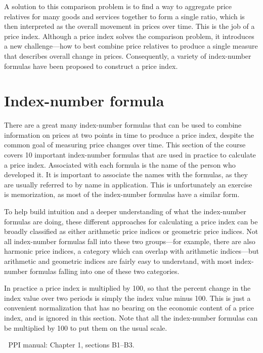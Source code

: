 \documentclass[
]{article}
\begin{document}
A solution to this comparison problem is to find a way to aggregate price relatives for many goods and services together to form a single ratio, which is then interpreted as the overall movement in prices over time. This is the job of a price index. Although a price index solves the comparison problem, it introduces a new challenge---how to best combine price relatives to produce a single measure that describes overall change in prices. Consequently, a variety of index-number formulas have been proposed to construct a price index.

\hypertarget{index-number-formula}{%
\section{Index-number formula}\label{index-number-formula}}

There are a great many index-number formulas that can be used to combine information on prices at two points in time to produce a price index, despite the common goal of measuring price changes over time. This section of the course covers 10 important index-number formulas that are used in practice to calculate a price index. Associated with each formula is the name of the person who developed it. It is important to associate the names with the formulas, as they are usually referred to by name in application. This is unfortunately an exercise is memorization, as most of the index-number formulas have a similar form.

To help build intuition and a deeper understanding of what the index-number formulas are doing, these different approaches for calculating a price index can be broadly classified as either arithmetic price indices or geometric price indices. Not all index-number formulas fall into these two groups---for example, there are also harmonic price indices, a category which can overlap with arithmetic indices---but arithmetic and geometric indices are fairly easy to understand, with most index-number formulas falling into one of these two categories.

In practice a price index is multiplied by 100, so that the percent change in the index value over two periods is simply the index value minus 100. This is just a convenient normalization that has no bearing on the economic content of a price index, and is ignored in this section. Note that all the index-number formulas can be multiplied by 100 to put them on the usual scale.

📖 PPI manual: Chapter 1, sections B1--B3.
\end{document}
